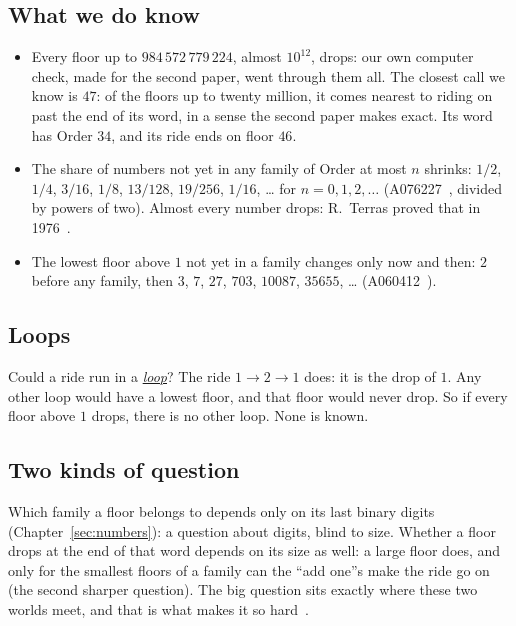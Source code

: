 \documentclass[10pt,a4paper,titlepage]{article}
\makeatletter
\newcommand{\termhere}[1]{\leavevmode
  \Hy@raisedlink{\hyper@anchorstart{term:#1}\hyper@anchorend}}
\newcommand{\keyterm}[2]{\hyperlink{box:#1}{\emph{#2}}}
\makeatother
\begin{document}
\subsection*{What we do know}

\begin{itemize}
\item Every floor up to $984\,572\,779\,224$, almost $10^{12}$, drops: our own computer
  check, made for the second paper, went through them all. The closest call we know is
  $47$: of the floors up to twenty million, it comes nearest to riding on past the end of its word,
  in a sense the second paper makes exact. Its word has Order $34$, and its ride ends
  on floor $46$.
\item The share of numbers not yet in any family of Order at most $n$ shrinks:
  $1/2$, $1/4$, $3/16$, $1/8$, $13/128$, $19/256$, $1/16$, \dots{} for $n = 0, 1, 2, \dots$
  (A076227~\cite{OEIS_A076227}, divided by powers of two).
  Almost every number drops: R.~Terras proved that in 1976~\cite{Terras1976}.
\item The lowest floor above $1$ not yet in a family changes only now and then:
  $2$ before any family, then $3$, $7$, $27$, $703$, $10087$, $35655$, \dots
  (A060412~\cite{OEIS_A060412}).
\end{itemize}

\subsection*{Loops}

\termhere{loop}Could a ride run in a \keyterm{loop}{loop}? The ride $1 \to 2 \to 1$ does: it is the drop of $1$. Any other loop would have a lowest floor, and that floor would never drop.
So if every floor above $1$ drops, there is no other loop. None is known.

\subsection*{Two kinds of question}

Which family a floor belongs to depends only on its last binary digits
(Chapter~\ref{sec:numbers}): a question about digits, blind to size. Whether a floor
drops at the end of that word depends on its size as well: a large floor does, and only
for the smallest floors of a family can the ``add one''s make the ride go on (the second
sharper question). The big question sits exactly where these two worlds
meet, and that is what makes it so hard~\cite{Lagarias1985}.
\end{document}

